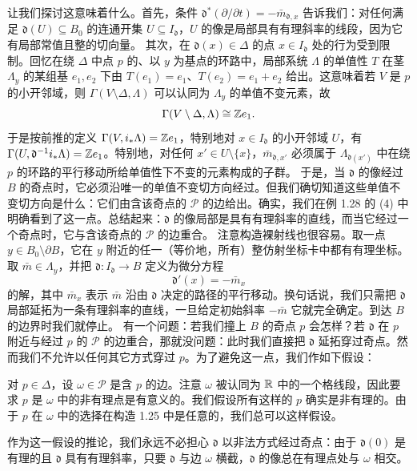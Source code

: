 让我们探讨这意味着什么。首先，条件 $\mathfrak{d}^*(\partial/\partial t)=-\bar m_{\mathfrak{d},x}$ 告诉我们：对任何满足 $\mathfrak{d}(U)\subseteq B_0$ 的连通开集 $U\subseteq I_{\mathfrak{d}}$，$U$ 的像是局部具有有理斜率的线段，因为它有局部常值且整的切向量。
其次，在 $\mathfrak{d}(x)\in\Delta$ 的点 $x\in I_{\mathfrak{d}}$ 处的行为受到限制。回忆在绕 $\Delta$ 中点 $p$ 的、以 $y$ 为基点的环路中，局部系统 $\Lambda$ 的单值性 $T$ 在茎 $\Lambda_y$ 的某组基 $e_1,e_2$ 下由 $T(e_1)=e_1$、$T(e_2)=e_1+e_2$ 给出。这意味着若 $V$ 是 $p$ 的小开邻域，则 $\Gamma(V\setminus\Delta,\Lambda)$ 可以认同为 $\Lambda_y$ 的单值不变元素，故
\[
\Gamma(V\setminus\Delta,\Lambda)\cong\mathbb{Z} e_1.
\]
于是按前推的定义 $\Gamma(V,i_*\Lambda)=\mathbb{Z} e_1$，特别地对 $x\in I_{\mathfrak{d}}$ 的小开邻域 $U$，有 $\Gamma(U,\mathfrak{d}^{-1}i_*\Lambda)=\mathbb{Z} e_1$。特别地，对任何 $x'\in U\setminus\{x\}$，$\bar m_{\mathfrak{d},x'}$ 必须属于 $\Lambda_{\mathfrak{d}(x')}$ 中在绕 $p$ 的环路的平行移动所给单值性下不变的元素构成的子群。
于是，当 $\mathfrak{d}$ 的像经过 $B$ 的奇点时，它必须沿唯一的单值不变切方向经过。但我们确切知道这些单值不变切方向是什么：它们由含该奇点的 $\mathcal{P}$ 的边给出。确实，我们在例 1.28 的 (4) 中明确看到了这一点。总结起来：$\mathfrak{d}$ 的像局部是具有有理斜率的直线，而当它经过一个奇点时，它与含该奇点的 $\mathcal{P}$ 的边重合。
注意构造裸射线也很容易。取一点 $y\in B_0\setminus\partial B$，它在 $y$ 附近的任一（等价地，所有）整仿射坐标卡中都有有理坐标。取 $\bar m\in\Lambda_y$，并把 $\mathfrak{d}:I_{\mathfrak{d}}\to B$ 定义为微分方程
\[
\mathfrak{d}'(x)=-\bar m_x
\]
的解，其中 $\bar m_x$ 表示 $\bar m$ 沿由 $\mathfrak{d}$ 决定的路径的平行移动。换句话说，我们只需把 $\mathfrak{d}$ 局部延拓为一条有理斜率的直线，一旦给定初始斜率 $-\bar m$ 它就完全确定。到达 $B$ 的边界时我们就停止。
有一个问题：若我们撞上 $B$ 的奇点 $p$ 会怎样？若 $\mathfrak{d}$ 在 $p$ 附近与经过 $p$ 的 $\mathcal{P}$ 的边重合，那就没问题：此时我们直接把 $\mathfrak{d}$ 延拓穿过奇点。然而我们不允许以任何其它方式穿过 $p$。为了避免这一点，我们作如下假设：

\begin{assumption}
对 $p\in\Delta$，设 $\omega\in\mathcal{P}$ 是含 $p$ 的边。注意 $\omega$ 被认同为 $\mathbb{R}$ 中的一个格线段，因此要求 $p$ 是 $\omega$ 中的非有理点是有意义的。我们假设所有这样的 $p$ 确实是非有理的。由于 $p$ 在 $\omega$ 中的选择在构造 1.25 中是任意的，我们总可以这样假设。
\end{assumption}

作为这一假设的推论，我们永远不必担心 $\mathfrak{d}$ 以非法方式经过奇点：由于 $\mathfrak{d}(0)$ 是有理的且 $\mathfrak{d}$ 具有有理斜率，只要 $\mathfrak{d}$ 与边 $\omega$ 横截，$\mathfrak{d}$ 的像总在有理点处与 $\omega$ 相交。

